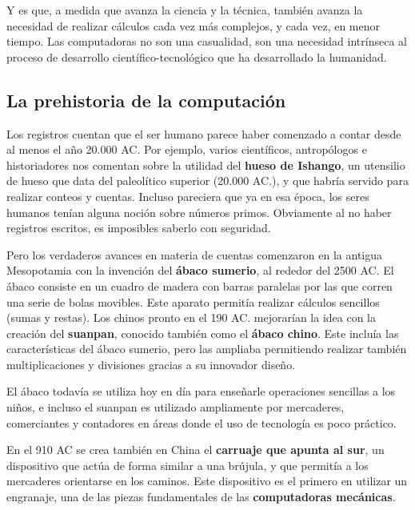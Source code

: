 Y es que, a medida que avanza la ciencia y la técnica, también avanza la necesidad
de realizar cálculos cada vez más complejos, y cada vez, en menor tiempo. Las
computadoras no son una casualidad, son una necesidad intrínseca al proceso de
desarrollo científico-tecnológico que ha desarrollado la humanidad.

\subsection{La prehistoria de la computación}

Los registros cuentan que el ser humano parece haber comenzado a contar desde al
menos el año 20.000 AC. Por ejemplo, varios científicos, antropólogos e
historiadores nos comentan sobre la utilidad del \textbf{hueso de Ishango}, un
utensilio de hueso que data del paleolítico superior (20.000 AC.), y que habría
servido para realizar conteos y cuentas. Incluso pareciera que ya en esa época,
los seres humanos tenían alguna noción sobre números primos. Obviamente al no
haber registros escritos, es imposibles saberlo con seguridad.\autocite{bogoshi_1987}

Pero los verdaderos avances en materia de cuentas comenzaron en la antigua Mesopotamia
con la invención del \textbf{ábaco sumerio}, al rededor del 2500 AC. El ábaco
consiste en un cuadro de madera con barras paralelas por las que corren una
serie de bolas movibles. Este aparato permitía realizar cálculos sencillos
(sumas y restas). Los chinos pronto en el 190 AC. mejorarían la idea con la
creación del \textbf{suanpan}, conocido también como el \textbf{ábaco chino}.
Este incluía las características del ábaco sumerio, pero las ampliaba permitiendo
realizar también multiplicaciones y divisiones gracias a su innovador diseño.
\autocite[vid.]{boyer_1991}

\begin{knowwhat}
    El ábaco todavía se utiliza hoy en día para enseñarle operaciones sencillas a
    los niños, e incluso el suanpan es utilizado ampliamente por mercaderes,
    comerciantes y contadores en áreas donde el uso de tecnología es poco práctico.
\end{knowwhat}

En el 910 AC se crea también en China el \textbf{carruaje que apunta al sur}, un
dispositivo que actúa de forma similar a una brújula, y que permitía a los
mercaderes orientarse en los caminos. Este dispositivo es el primero en utilizar
un engranaje, una de las piezas fundamentales de las \textbf{computadoras
mecánicas}.

